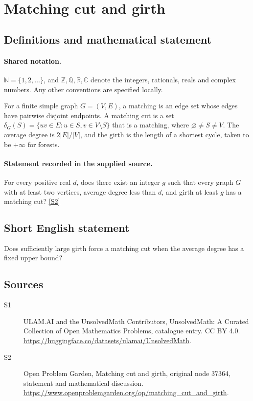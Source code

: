 \documentclass[11pt]{article}
\newcommand{\sref}[2]{\hyperlink{source:#1:#2}{[S#2]}}
\begin{document}
\section{Matching cut and girth}\label{statement}

\subsection{Definitions and mathematical statement}

\paragraph{Shared notation.}$\mathbb N=\{1,2,\ldots\}$, and $\mathbb Z,\mathbb Q,\mathbb R,\mathbb C$ denote the integers, rationals, reals and complex numbers. Any other conventions are specified locally.


For a finite simple graph $G=(V,E)$, a matching is an edge set whose edges have pairwise disjoint endpoints. A matching cut is a set $\delta_G(S)=\{uv\in E:u\in S,v\in V\setminus S\}$ that is a matching, where $\varnothing\ne S\ne V$. The average degree is $2|E|/|V|$, and the girth is the length of a shortest cycle, taken to be $+\infty$ for forests.
\paragraph{Statement recorded in the supplied source.}
For every positive real $d$, does there exist an integer $g$ such that every graph $G$ with at least two vertices, average degree less than $d$, and girth at least $g$ has a matching cut? \sref{statement}{2}
\subsection{Short English statement}
Does sufficiently large girth force a matching cut when the average degree has a fixed upper bound?
\subsection{Sources}
\begin{description}
\item[\hypertarget{source:statement:1}{S1}] ULAM.AI and the UnsolvedMath Contributors, UnsolvedMath: A Curated Collection of Open Mathematics Problems, catalogue entry. CC BY 4.0. \url{https://huggingface.co/datasets/ulamai/UnsolvedMath}.
\item[\hypertarget{source:statement:2}{S2}] Open Problem Garden, Matching cut and girth, original node 37364, statement and mathematical discussion. \url{https://www.openproblemgarden.org/op/matching_cut_and_girth}.
\end{description}
\label{end:statement}
\end{document}
